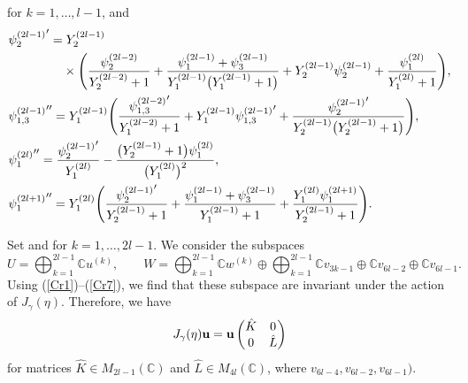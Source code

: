 \documentclass[pdftex]{sigma}
\numberwithin{equation}{section}
\newcommand{\C}{{\mathbb C}}
\newcommand{\op}{\oplus}
\newcommand{\Op}{\bigoplus}
\begin{document}
	for $k=1,\dots,l-1$, and
		\begin{align}
		\label{Cr5}&{\psi_2^{(2l-1)}}^\prime=Y_2^{(2l-1)}\\
&\nonumber\hphantom{{\psi_2^{(2l-1)}}^\prime=}{}\times
\Biggl(\frac{\psi_2^{(2l-2)}}{Y_2^{(2l-2)}+1}+\frac{\psi_1^{(2l-1)}+\psi_3^{(2l-1)}}{Y_1^{(2l-1)}\bigl(Y_1^{(2l-1)}+1\bigr)}+Y_2^{(2l-1)}\psi_2^{(2l-1)}+\frac{\psi_1^{(2l)}}{Y_1^{(2l)}+1}\Biggr),\\
		\label{Crp5}&{\psi_{1,3}^{(2l-1)}}^{\prime\prime}=Y_1^{(2l-1)}\Biggl(\frac{{\psi_{1,3}^{(2l-2)}}^\prime}{Y_1^{(2l-2)}+1}+Y_1^{(2l-1)}{\psi_{1,3}^{(2l-1)}}^\prime+\frac{{\psi_2^{(2l-1)}}^\prime}{Y_2^{(2l-1)}\bigl(Y_2^{(2l-1)}+1\bigr)}\Biggr),\\
		\label{Cr6}&{\psi_1^{(2l)}}^{\prime\prime}=\frac{{\psi_2^{(2l-1)}}^\prime}{Y_1^{(2l)}}-\frac{\bigl(Y_2^{(2l-1)}+1\bigr)\psi_1^{(2l)}}{\bigl(Y_1^{(2l)}\bigr)^2},\\
		\label{Cr7}&{\psi_1^{(2l+1)}}^{\prime\prime}=Y_1^{(2l)}\Biggl(\frac{{\psi_2^{(2l-1)}}^\prime}{Y_2^{(2l-1)}+1}+\frac{\psi_1^{(2l-1)}+\psi_3^{(2l-1)}}{Y_1^{(2l-1)}+1}+\frac{Y_1^{(2l)}\psi_1^{(2l+1)}}{Y_2^{(2l-1)}+1}\Biggr).
		\end{align}

Set  and  for $k=1,\dots, 2l-1$.
We consider the subspaces
	\[U=\Op_{k=1}^{2l-1}\C u^{(k)},\qquad W=\Op_{k=1}^{2l-1}\C w^{(k)}\op\Op_{k=1}^{2l-1}\C v_{3k-1}\op\C v_{6l-2}\op\C v_{6l-1}.\]
Using (\ref{Cr1})--(\ref{Cr7}), we find that these subspace are invariant under the action of $J_\gamma(\eta)$.
Therefore, we have
	\begin{align*}
	J_\gamma(\eta){\bf u}={\bf u}
		\begin{pmatrix}
		\hat{K}&0\\
		0&\hat{L}
		\end{pmatrix}
	\end{align*}
for matrices $\hat{K}\in M_{2l-1}(\C)$ and $\hat{L}\in M_{4l}(\C)$, where  $v_{6l-4},v_{6l-2},v_{6l-1}\bigr)$.
\end{document}
